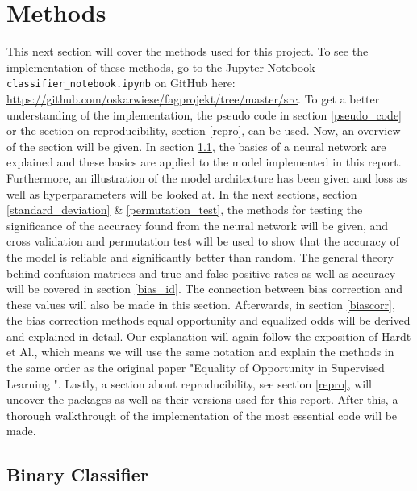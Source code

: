 \documentclass[11pt, fleqn, titlepage]{article}
\begin{document}
	\section{Methods} \label{methods}
	This next section will cover the methods used for this project. To see the implementation of these methods, go to the Jupyter Notebook \texttt{classifier\_notebook.ipynb} on GitHub here: \url{https://github.com/oskarwiese/fagprojekt/tree/master/src}. To get a better understanding of the implementation, the pseudo code in section \ref{pseudo_code} or the section on reproducibility, section \ref{repro}, can be used. Now, an overview of the section will be given. In section \ref{Feed-forward neural}, the basics of a neural network are explained and these basics are applied to the model implemented in this report. Furthermore, an illustration of the model architecture has been given and loss as well as hyperparameters will be looked at. In the next sections, section \ref{standard_deviation} \& \ref{permutation_test}, the methods for testing the significance of the accuracy found from the neural network will be given, and cross validation and permutation test will be used to show that the accuracy of the model is reliable and significantly better than random. The general theory behind confusion matrices and true and false positive rates as well as accuracy will be covered in section \ref{bias_id}. The connection between bias correction and these values will also be made in this section. Afterwards, in section \ref{biascorr}, the bias correction methods equal opportunity and equalized odds will be derived and explained in detail. Our explanation will again follow the exposition of Hardt et Al., which means we will use the same notation and explain the methods in the same order as the original paper "Equality of Opportunity in Supervised Learning \cite{equal_of_oppor}". Lastly, a section about reproducibility, see section \ref{repro}, will uncover the packages as well as their versions used for this report. After this, a thorough walkthrough of the implementation of the most essential code will be made.
	
	\subsection{Binary Classifier}\label{Feed-forward neural}
\end{document}
